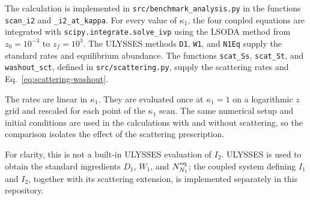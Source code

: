 The calculation is implemented in \texttt{src/benchmark\_analysis.py} in the
functions \texttt{scan\_i2} and \texttt{\_i2\_at\_kappa}.  For every value of
$\kappa_1$, the four coupled equations are integrated with
\texttt{scipy.integrate.solve\_ivp} using the LSODA method from
$z_0=10^{-3}$ to $z_f=10^3$.  The ULYSSES methods \texttt{D1}, \texttt{W1},
and \texttt{N1Eq} supply the standard rates and equilibrium abundance.  The
functions \texttt{scat\_Ss}, \texttt{scat\_St}, and
\texttt{washout\_sct}, defined in \texttt{src/scattering.py}, supply the
scattering rates and Eq.~\eqref{eq:scattering-washout}.

The rates are linear in $\kappa_1$.  They are evaluated once at
$\kappa_1=1$ on a logarithmic $z$ grid and rescaled for each point of the
$\kappa_1$ scan.  The same numerical setup and initial conditions are used in
the calculations with and without scattering, so the comparison isolates the
effect of the scattering prescription.

For clarity, this is not a built-in ULYSSES evaluation of $I_2$.  ULYSSES is
used to obtain the standard ingredients $D_1$, $W_1$, and
$N_{N_1}^{\rm eq}$; the coupled system defining $I_1$ and $I_2$, together with
its scattering extension, is implemented separately in this repository.

